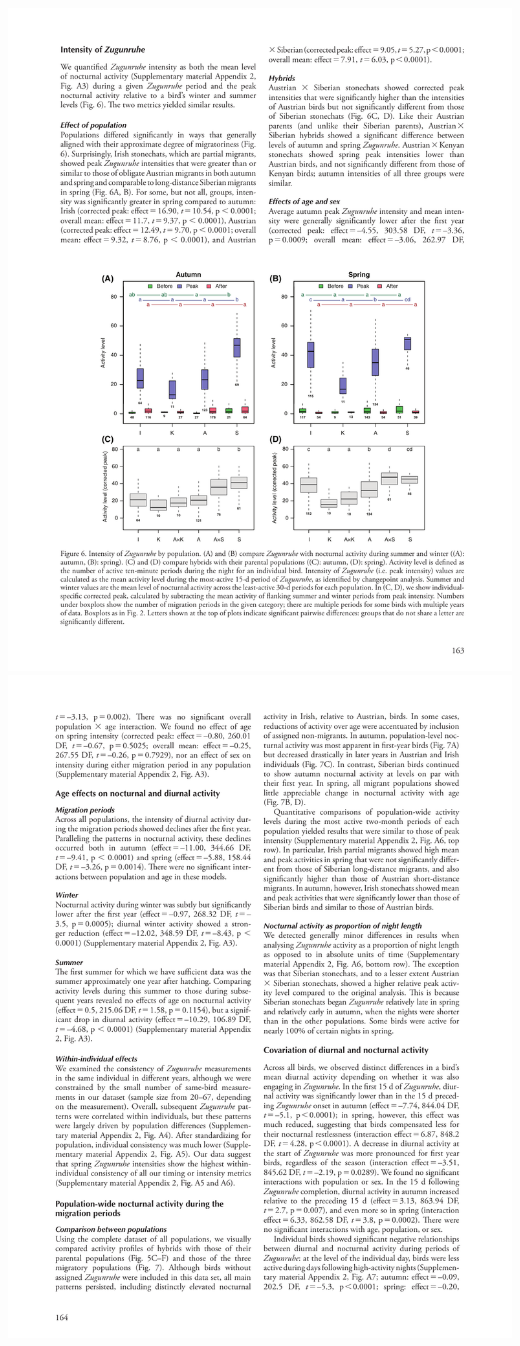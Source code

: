 \documentclass[a4paper, twoside]{templates/ociamthesis}
\begin{document}
\includegraphics[width=1\linewidth]{pdf_chapters/zug/zug_crop_Part09}
\includegraphics[width=1\linewidth]{pdf_chapters/zug/zug_crop_Part10}
\end{document}
